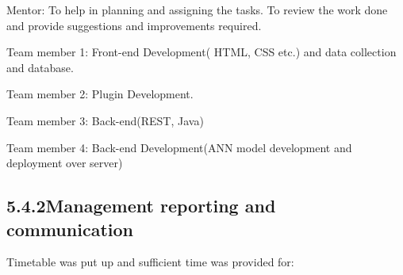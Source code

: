 \documentclass[oneside,a4paper,12pt]{book}
\begin{document}
\tab Mentor: To help in planning and assigning the tasks. To review the work done and provide suggestions and improvements required.\par

Team member 1: Front-end Development( HTML, CSS etc.) and data collection and database.\par

Team member 2: Plugin Development.\par

Team member 3: Back-end(REST, Java)\par

Team member 4: Back-end Development(ANN model development and deployment over server)\par

\subsection*{5.4.2\hspace*{10pt}Management reporting and communication}
Timetable was put up and sufficient time was provided for:\par
\end{document}
